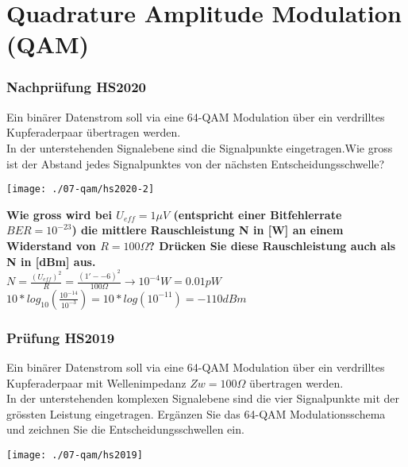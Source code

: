 

\section{Quadrature Amplitude Modulation (QAM)}

\subsubsection{Nachprüfung HS2020}
Ein binärer Datenstrom soll via eine 64-QAM Modulation über ein verdrilltes Kupferaderpaar übertragen werden.\\
In der unterstehenden Signalebene sind die Signalpunkte eingetragen.Wie gross ist der Abstand jedes Signalpunktes von der nächsten Entscheidungsschwelle?\\
\begin{center}
    \vspace{-8pt}
    \texttt{[image: ./07-qam/hs2020-2]}
    \vspace{-8pt}
\end{center}

\textbf{Wie gross wird bei $U_{eff}=1\mu V$ (entspricht einer Bitfehlerrate $BER = 10^{-23}$) die mittlere Rauschleistung N in [W] an einem Widerstand von $R=100\Omega$? 
Drücken Sie diese Rauschleistung auch als N in [dBm] aus.}\\
$N=\frac{(U_{eff})^2}{R}=\frac{(1'-{-6})^2}{100\Omega} \rightarrow 10^{-4}W=0.01pW$\\
$10*log_{10}(\frac{10^{-14}}{10^{-3}})=10*log(10^{-11})=-110dBm$

\subsubsection{Prüfung HS2019}
Ein binärer Datenstrom soll via eine 64-QAM Modulation über ein verdrilltes Kupferaderpaar mit Wellenimpedanz $Zw = 100 \Omega $  übertragen werden.\\
In der unterstehenden komplexen Signalebene sind die vier Signalpunkte mit der grössten Leistung eingetragen. Ergänzen Sie das 64-QAM Modulationsschema und zeichnen Sie
die Entscheidungsschwellen ein.\\
\begin{center}
    \vspace{-8pt}
    \texttt{[image: ./07-qam/hs2019]}
    \vspace{-8pt}
\end{center}

